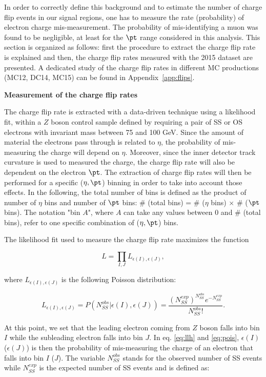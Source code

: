In order to correctly define this background and to estimate the number of charge flip events in our signal regions, one has to measure the rate (probability) of electron charge mis-measurement. The probability of mis-identifying a muon was found to be negligible, at least for the $\pt$ range considered in this analysis. 
This section is organized as follows: first the procedure to extract the charge flip rate is explained and then, 
the charge flip rates measured with the 2015 dataset are presented. 
A dedicated study of the charge flip rates in different MC productions (MC12, DC14, MC15) can be found in Appendix~\ref{app:flips}.


\par{\bf Measurement of the charge flip rates}

The charge flip rate is extracted with a data-driven technique using a likelihood fit, within a $Z$ boson control sample defined by requiring a pair of SS or OS electrons with invariant mass between 75 and 100 GeV. Since the amount of material the electrons pass through is related to $\eta$, the probability of mis-measuring the charge will depend on $\eta$. Moreover, since the inner detector track curvature is used to measured the charge, the charge flip rate will also be dependent on the electron $\pt$.  
The extraction of charge flip rates will then be performed for a specific ($\eta, \pt$) binning in order to take into account those effects. In the following, the total number of bins is defined as the product of number of $\eta$ bins and number of $\pt$ bins: \# (total bins) = \# ($\eta$ bins) $\times$ \# ($\pt$ bins). The notation "bin $A$", where $A$ can take any values between 0 and \# (total bins), refer to one specific combination of ($\eta,\pt$) bins.

The likelihood fit used to measure the charge flip rate maximizes the function

\begin{equation}
\label{eq:llh}
L = \prod_{I, J} L_{\epsilon(I),\epsilon(J)},
\end{equation}

where $L_{\epsilon(I),\epsilon(J)}$ is the following Poisson distribution:

\begin{equation}
\label{eq:pois}
L_{\epsilon(I),\epsilon(J)} = P(N_{SS}^{obs} | \epsilon(I), \epsilon(J)) = \frac{(N_{SS}^{exp})^{N_{SS}^{obs}} e^{-N_{SS}^{exp}} } {N_{SS}^{obs} !}.
\end{equation}

At this point, we set that the leading electron coming from $Z$ boson falls into bin $I$ while the subleading electron falls into bin $J$. In eq. \ref{eq:llh} and \ref{eq:pois}, $\epsilon(I)$ ($\epsilon(J)$) is then the probability of mis-measuring the charge of an electron that falls into bin $I$ ($J$). The variable $N_{SS}^{obs}$ stands for the observed number of SS events while $N_{SS}^{exp}$ is the expected number of SS events and is defined as:

